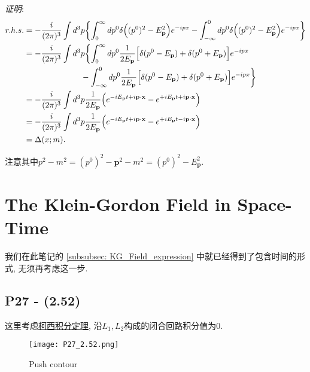 \textit{证明}:
\begin{equation}
  \begin{aligned}
    r. h. s. & = -\frac{i}{(2\pi)^3}\int d^3 p \biggl\{ \int_{0}^{\infty}dp^0\delta\Bigl((p^0)^2 - E_\mathbf{p}^2\Bigr)e^{-ipx} - \int_{-\infty}^{0}dp^0\delta\Bigl((p^0)^2 - E_\mathbf{p}^2\Bigr)e^{-ipx} \biggr\} \\
             & = -\frac{i}{(2\pi)^3}\int d^3 p \biggl\{ \int_{0}^{\infty}dp^0\frac{1}{2E_\mathbf{p}}\Bigl[\delta(p^0 - E_\mathbf{p}) + \delta(p^0 + E_\mathbf{p}) \Bigr]e^{-ipx}                                    \\
             & \qquad \qquad \qquad \quad -
    \int_{-\infty}^{0}dp^0\frac{1}{2E_\mathbf{p}}\Bigl[\delta(p^0 - E_\mathbf{p}) + \delta(p^0 + E_\mathbf{p}) \Bigr]e^{-ipx}\biggr\}                                                                               \\
             & = -\frac{i}{(2\pi)^3} \int d^3 p \frac{1}{2E_\mathbf{p}} \Bigl(e^{-iE_\mathbf{p} t + i \mathbf{p} \cdot \mathbf{x}} - e^{+iE_\mathbf{p} t + i \mathbf{p} \cdot \mathbf{x}}\Bigr)                     \\
             & = -\frac{i}{(2\pi)^3} \int d^3 p \frac{1}{2E_\mathbf{p}} \Bigl(e^{-iE_\mathbf{p} t + i \mathbf{p} \cdot \mathbf{x}} - e^{+iE_\mathbf{p} t - i \mathbf{p} \cdot \mathbf{x}}\Bigr)                     \\
             & = \Delta(x; m).
  \end{aligned}
\end{equation}

注意其中$p^2 - m^2 = (p^0)^2 - \mathbf{p}^2 - m^2 = (p^0)^2 - E_\mathbf{p}^2$.

\section{The Klein-Gordon Field in Space-Time}

我们在此笔记的 \ref{subsubsec: KG_Field_expression} 中就已经得到了包含时间的形式, 无须再考虑这一步.

\subsection{P27 - (2.52)}
这里考虑\href{https://zh.wikipedia.org/wiki/柯西积分定理}{柯西积分定理},
沿$L_1, L_2$构成的闭合回路积分值为0.

\begin{figure}[htbp]
  \centering
  \texttt{[image: P27\_2.52.png]}
  \caption{Push contour}
  \label{fig: pushcon}
\end{figure}

